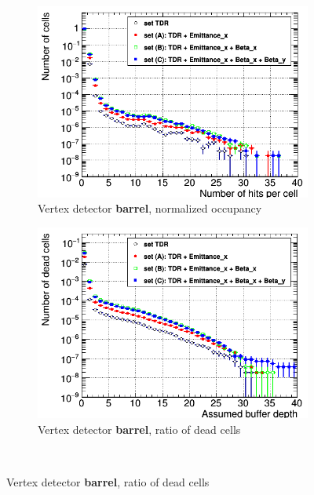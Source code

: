  
  \begin{figure}
 \centering
  \begin{subfigure}[b]{0.49\textwidth}
   \centering
    \includegraphics[width=\textwidth]{Figures/Pairs/Occupancy_Comparison_Layer_0_numcells_ILC250_Comparison_ALL_SETS_5T_w_antiDiD_LEG.png}
   \caption{Vertex detector \textbf{barrel}, normalized occupancy}
   \end{subfigure}
   \hfill
    \begin{subfigure}[b]{0.49\textwidth}
   \centering
    \includegraphics[width=\textwidth]{Figures/Pairs/Occupancy_Comparison_Layer_0_deadcells_ILC250_Comparison_ALL_SETS_5T_w_antiDiD_LEG.png}
   \caption{Vertex detector \textbf{barrel}, ratio of dead cells}
   \end{subfigure}\\

\end{figure}
